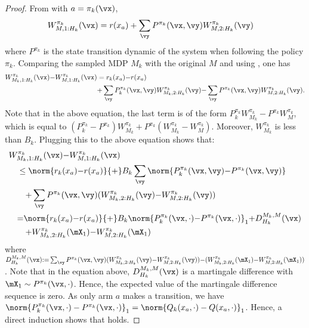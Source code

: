 \begin{proof}
    From  with $a=\pi_k(\vx)$,
    \begin{align}
        W^{\pi_k}_{M, 1:H_k}(\vx) 
        &=r(x_a) + \sum_{\vy} P^{\pi_k}(\vx, \vy)W^{\pi_k}_{M,2:H_k}(\vy) \label{eq:decompo2}
    \end{align}
    where $P^{\pi_k}$ is the state transition dynamic of the system when following the policy $\pi_k$. Comparing the sampled MDP $M_k$ with the original $M$ and using , one has
    \begin{align}
        W^{\pi_k}_{M_k, 1:H_k}(\vx) {-} W^{\pi_k}_{M, 1:H_k}(\vx)
        &= r_k(x_a) {-} r(x_a) \nonumber \\
        &{+} \sum_{\vy} P_k^{\pi_k}(\vx, \vy)W^{\pi_k}_{M_k, 2:H_k}(\vy) {-} \sum_{\vy} P^{\pi_k}(\vx, \vy)W^{\pi_k}_{M, 2:H_k}(\vy) \label{eq:depend_S}.
    \end{align}
    Note that in the above equation, the last term is of the form $P_k^{\pi_k}W^{\pi_k}_{M_k} {-}P^{\pi_k}W^{\pi_k}_{M}$, which is equal to $(P_k^{\pi_k} {-}P^{\pi_k})W^{\pi_k}_{M_k} {+}P^{\pi_k}(W^{\pi_k}_{M_k} {-}W^{\pi_k}_{M})$. Moreover, $W_{M_k}^{\pi_k}$ is less than $B_k$.
    Plugging this to the above equation shows that:
    \begin{align*}
        &W^{\pi_k}_{M_k, 1:H_k}(\vx) {-} W^{\pi_k}_{M, 1:H_k}(\vx) \\
        &\quad\le \norm{r_k(x_a) {-} r(x_a)} {+} B_k\sum_{\vy}\norm{P_k^{\pi_k}(\vx, \vy) {-} P^{\pi_k}(\vx, \vy)}\\
        &\qquad {+} \sum_{\vy} P^{\pi_k}(\vx, \vy)(W^{\pi_k}_{M_k, 2:H_k}(\vy) {-} W^{\pi_k}_{M, 2:H_k}(\vy))\\
        &\quad {=}\norm{r_k(x_a) {-} r(x_a)} {+} B_k\norm{P_k^{\pi_k}(\vx,\cdot){-}P^{\pi_k}(\vx,\cdot)}_1 {+} D^{M_k,M}_{H_k}(\vx) \\
        &\qquad {+}W^{\pi_k}_{M_k, 2:H_k}(\mX_1) {-} W^{\pi_k}_{M, 2:H_k}(\mX_1)
    \end{align*}
    where $D^{M_k,M}_{H_k}(\vx){:=} \sum_{\vy}P^{\pi_k}(\vx, \vy)(W^{\pi_k}_{M_k, 2:H_k}(\vy) {-} W^{\pi_k}_{M, 2:H_k}(\vy)) {-}(W^{\pi_k}_{M_k, 2:H_k}(\mX_1) {-} W^{\pi_k}_{M, 2:H_k}(\mX_1))$.
    Note that in the equation above, $D^{M_k,M}_{H_k}(\vx)$ is a martingale difference with ${\mX_1\sim P^{\pi_k}(\vx,\cdot)}$.
    Hence, the expected value of the martingale difference sequence  is zero.
    As only arm $a$ makes a transition, we have $\norm{P_k^{\pi_k}(\vx,\cdot)-P^{\pi_k}(\vx,\cdot)}_1=\norm{Q_{k}(x_a,\cdot)-Q(x_a,\cdot)}_1$. Hence, a direct induction shows that  holds.
\end{proof}

